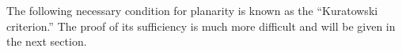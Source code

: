 The following necessary condition for planarity is known as the “Kuratowski criterion.” The proof of its sufficiency is much more difficult and will be given in the next section.
